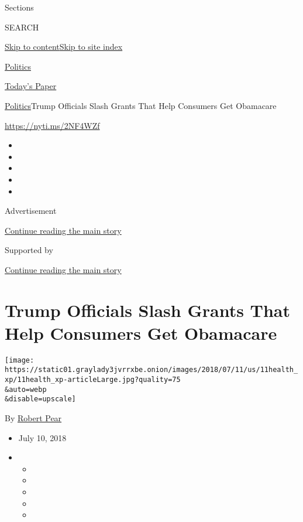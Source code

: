 Sections

SEARCH

\protect\hyperlink{site-content}{Skip to
content}\protect\hyperlink{site-index}{Skip to site index}

\href{https://www.nytimes3xbfgragh.onion/section/politics}{Politics}

\href{https://myaccount.nytimes3xbfgragh.onion/auth/login?response_type=cookie\&client_id=vi}{}

\href{https://www.nytimes3xbfgragh.onion/section/todayspaper}{Today's
Paper}

\href{/section/politics}{Politics}\textbar{}Trump Officials Slash Grants
That Help Consumers Get Obamacare

\url{https://nyti.ms/2NF4WZf}

\begin{itemize}
\item
\item
\item
\item
\item
\end{itemize}

Advertisement

\protect\hyperlink{after-top}{Continue reading the main story}

Supported by

\protect\hyperlink{after-sponsor}{Continue reading the main story}

\hypertarget{trump-officials-slash-grants-that-help-consumers-get-obamacare}{%
\section{Trump Officials Slash Grants That Help Consumers Get
Obamacare}\label{trump-officials-slash-grants-that-help-consumers-get-obamacare}}

\texttt{[image: https://static01.graylady3jvrrxbe.onion/images/2018/07/11/us/11health\_xp/11health\_xp-articleLarge.jpg?quality=75\\\&auto=webp\\\&disable=upscale]}

By \href{https://www.nytimes3xbfgragh.onion/by/robert-pear}{Robert Pear}

\begin{itemize}
\item
  July 10, 2018
\item
  \begin{itemize}
  \item
  \item
  \item
  \item
  \item
  \end{itemize}
\end{itemize}

